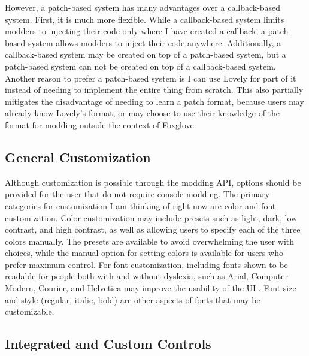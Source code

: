 \documentclass[10pt,twocolumn]{article}
\begin{document}
However, a patch-based system has many advantages over a callback-based system.
First, it is much more flexible. While a callback-based system limits modders to
injecting their code only where I have created a callback, a patch-based system
allows modders to inject their code anywhere. Additionally, a callback-based
system may be created on top of a patch-based system, but a patch-based system
can not be created on top of a callback-based system. Another reason to prefer a
patch-based system is I can use Lovely for part of it
instead of needing to
implement the entire thing from scratch. This also partially mitigates the
disadvantage of needing to learn a patch format, because users may already know
Lovely's format,
or may choose to use their knowledge of the format for modding
outside the context of Foxglove.

\subsection{General Customization}

Although customization is possible through the modding API, options should be
provided for the user that do not require console modding. The primary
categories for customization I am thinking of right now are color and font
customization. Color customization may
include presets such as light, dark, low contrast, and high contrast, as well as
allowing users to specify each of the three colors manually. The presets are
available to avoid overwhelming the user with choices, while the manual option
for setting colors is available for users who prefer maximum control. For font
customization, including fonts shown to be readable for people both with and
without dyslexia, such as Arial, Computer Modern, Courier, and Helvetica may
improve the usability of the UI \cite{rello_effect_2016}. Font size and style
(regular, italic, bold) are other aspects of fonts that may be customizable.

\subsection{Integrated and Custom Controls}
\end{document}

